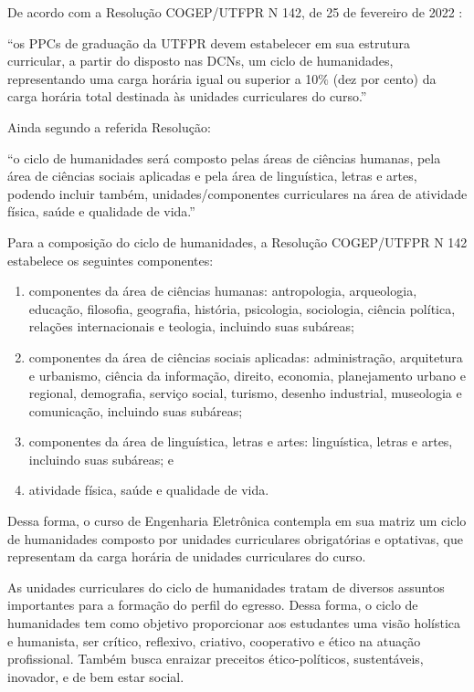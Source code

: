 De acordo com a Resolução COGEP/UTFPR N\textordmasculine{} 142, de 25 de fevereiro de 2022 \cite{cogep142}:

\begin{citacao}
	``os PPCs de graduação da UTFPR devem estabelecer em sua estrutura curricular, a partir do disposto nas DCNs, um ciclo de humanidades, representando uma carga horária igual ou superior a 10$\%$ (dez por cento) da carga horária total destinada às unidades curriculares do curso.''

\end{citacao}

Ainda segundo a referida Resolução: 

\begin{citacao}
	``o ciclo de humanidades será composto pelas áreas de ciências humanas, pela área de ciências sociais aplicadas e pela área de linguística, letras e artes, podendo incluir também, unidades/componentes curriculares na área de atividade física, saúde e qualidade de vida.''
\end{citacao}

Para a composição do ciclo de humanidades, a Resolução COGEP/UTFPR N\textordmasculine{} 142 estabelece os seguintes componentes:

\begin{enumerate}
	\item componentes da área de ciências humanas: antropologia, arqueologia, educação, filosofia, geografia, história, psicologia, sociologia, ciência política, relações internacionais e teologia, incluindo suas subáreas;
	\item componentes da área de ciências sociais aplicadas: administração, arquitetura e urbanismo, ciência da informação, direito, economia, planejamento urbano e regional, demografia, serviço social, turismo, desenho industrial, museologia e comunicação, incluindo suas subáreas;
	\item componentes da área de linguística, letras e artes: linguística, letras e artes, incluindo suas subáreas; e
	\item atividade física, saúde e qualidade de vida.
\end{enumerate}

Dessa forma, o curso de Engenharia Eletrônica contempla em sua matriz um ciclo de humanidades composto por unidades curriculares obrigatórias e optativas, que representam \percentagem{\the\value{horasH}}{\the\value{horasUC}} da carga horária de unidades curriculares do curso. 

As unidades curriculares do ciclo de humanidades tratam de diversos assuntos importantes para a formação do perfil do egresso. Dessa forma, o ciclo de humanidades tem como objetivo proporcionar aos estudantes uma visão holística e humanista, ser crítico, reflexivo, criativo, cooperativo e ético na atuação profissional. Também busca enraizar preceitos ético-políticos, sustentáveis, inovador, e de bem estar social.

